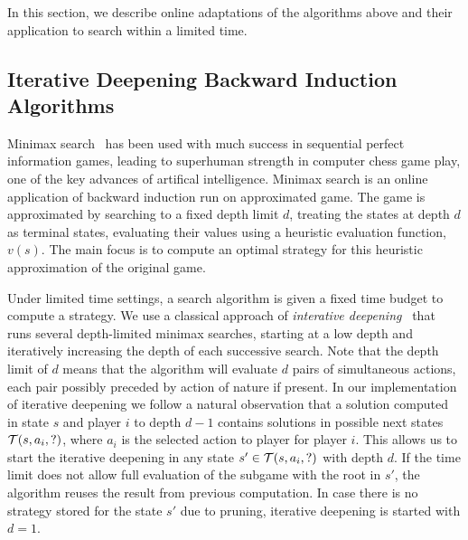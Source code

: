 In this section, we describe online adaptations of the algorithms above and their application 
to search within a limited time. 

\subsection{Iterative Deepening Backward Induction Algorithms} \label{sec:idbi}

Minimax search~\cite{AIbook} has been used with much success in sequential perfect information games, 
leading to superhuman strength in computer chess game play, one of the key advances of artifical 
intelligence. 
Minimax search is an online application of backward induction run on approximated game. 
The game is approximated by searching to a fixed depth limit $d$, treating the states at depth $d$
as terminal states, evaluating their values using a heuristic evaluation function, $v(s)$. 
The main focus is to compute an optimal strategy for this heuristic approximation of the original game. 

Under limited time settings, a search algorithm is given a fixed time budget to compute a strategy. 
We use a classical approach of {\it interative deepening}~\cite{AIbook} that runs several depth-limited 
minimax searches, starting at a low depth and iteratively increasing the depth of each successive search. 
Note that the depth limit of $d$ means that the algorithm will evaluate $d$ pairs of simultaneous actions, each pair possibly preceded by action of nature if present.  
In our implementation of iterative deepening we follow a natural observation that a solution computed in state $s$ and player $i$ to depth $d-1$ contains solutions in possible next states $\mathcal{T}(s,a_i,?)$, where $a_i$ is the selected action to player for player $i$.
This allows us to start the iterative deepening in any state $s' \in \mathcal{T}(s,a_i,?)$ with depth $d$.
If the time limit does not allow full evaluation of the subgame with the root in $s'$, the algorithm reuses the result from previous computation.
In case there is no strategy stored for the state $s'$ due to pruning, iterative deepening is started with $d = 1$.

